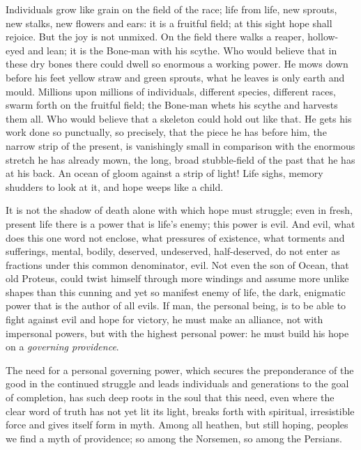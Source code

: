 \documentclass[12pt,a4paper,openany]{book}
\newcommand{\opage}[1]{\marginnote{\footnotesize\textit{[#1]}}}
\begin{document}
Individuals grow like grain on the field of the race; life from life, new sprouts, new stalks,
new flowers and ears: it is a fruitful field; at this sight hope shall rejoice. But the joy is
not unmixed. On the field there walks a reaper, hollow-eyed and lean; it is the Bone-man with
his scythe. Who would believe that in these dry bones there could dwell so enormous a working
power. %
He mows down before his feet yellow straw and green sprouts, what he leaves is only earth and
mould. Millions upon millions of individuals, different species, different races, swarm forth
on the fruitful field; the Bone-man whets his scythe and harvests them all. Who would believe
that a skeleton could hold out like that. He gets his work done so punctually, so precisely,
that the piece
\setcounter{footnote}{0}%
\opage{39}he has before him, the narrow strip of the present, is vanishingly small in comparison
with the enormous stretch he has already mown, the long, broad stubble-field of the past that
he has at his back. An ocean of gloom against a strip of light! Life sighs, memory shudders to
look at it, and hope weeps like a child.

It is not the shadow of death alone with which hope must struggle; even in fresh, present life
there is a power that is life's enemy; this power is evil. And evil, what does this one word
not enclose, what pressures of existence, what torments and sufferings, mental, bodily,
deserved, undeserved, half-deserved, do not enter as fractions under this common denominator,
evil. Not even the son of Ocean, that old Proteus, could twist himself through more windings
and assume more unlike shapes than this cunning and yet so manifest enemy of life, the dark,
enigmatic power that is the author of all evils. If man, the personal being, is to be able to
fight against evil and hope for victory, he must make an alliance, not with impersonal powers,
but with the highest personal power: he must build his hope on a \emph{governing providence}.

The need for a personal governing power, which secures the preponderance of the good in the
continued struggle and leads individuals and generations to the goal of completion, has such
deep roots in the soul that this need, even where the clear word of truth has not yet lit its
light, breaks forth with spiritual, irresistible force and gives itself form in myth. Among all
heathen, but still hoping, peoples we find a myth of providence; so among the Norsemen, so
among the Persians.
\end{document}

